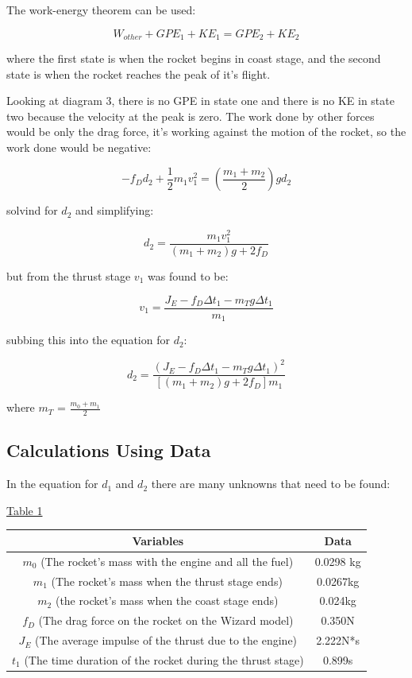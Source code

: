 \documentclass[aps,letterpaper,11pt]{revtex4}
\begin{document}
The work-energy theorem can be used:

$$ W_{other} + GPE_1 + KE_1 = GPE_2 + KE_2$$

where the first state is when the rocket begins in coast stage, and the second state is when the rocket reaches the peak of it's flight.

Looking at diagram 3, there is no GPE in state one and there is no KE in state two because the velocity at the peak is zero. The work done by other forces would be only the drag force, it's working against the motion of the rocket, so the work done would be negative:

$$ -f_Dd_2 + \frac{1}{2}m_1v_1^2 = (\frac{m_1+m_2}{2})gd_2$$

solvind for $d_2$ and simplifying:

$$ d_2 = \frac{m_1v_1^2}{(m_1+m_2)g + 2f_D}$$

but from the thrust stage $v_1$ was found to be: 

$$  v_1 = \frac{J_E - f_D\Delta t_1 - m_Tg\Delta t_1}{m_1}$$

subbing this into the equation for $d_2$:

$$ d_2 = \frac{(J_E-f_D\Delta t_1-m_Tg\Delta t_1)^2}{[(m_1+m_2)g+2f_D]m_1}$$

where $m_T$ = $\frac{m_0+m_1}{2}$

\subsection{Calculations Using Data}

In the equation for $d_1$ and $d_2$ there are many unknowns that need to be found: 

\begin{center}
\underline{Table 1}\\
\begin{tabular}{|c|c|}
\hline
Variables & Data\\
\hline
$m_0$ (The rocket's mass with the engine and all the fuel) & 0.0298 kg\\
\hline
$m_1$ (The rocket's mass when the thrust stage ends) & 0.0267kg\\
\hline
$m_2$ (the rocket's mass when the coast stage ends) & 0.024kg\\
\hline
$f_D$ (The drag force on the rocket on the Wizard model) & 0.350N\\
\hline
$J_E$ (The average impulse of the thrust due to the engine) & 2.222N*s\\
\hline
$t_1$ (The time duration of the rocket during the thrust stage) & 0.899s\\
\hline
\end{tabular}
\end{center}
\end{document}

